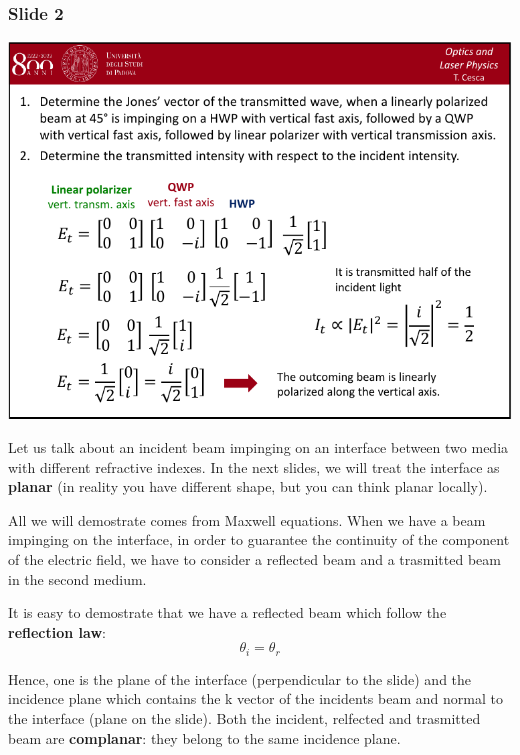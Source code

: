 \documentclass[../main/main.tex]{subfiles}
\begin{document}
\subsubsection*{Slide 2}

\begin{minipage}[]{0.5\linewidth}
\centering
\includegraphics[page=2,width=1\textwidth]{../lessons/pdf_file/04_lecture.pdf}
\end{minipage}
\hspace{0.3cm}\vspace{0.3cm}
\begin{minipage}[c]{0.47\linewidth}

Let us talk about an incident beam impinging on an interface between two media with different refractive indexes. In the next slides, we will treat the interface as \textbf{planar} (in reality you have different shape, but you can think planar locally).

All we will demostrate comes from Maxwell equations. When we have a beam impinging on the interface, in order to guarantee the continuity of the component of the electric field, we have to consider a reflected beam and a trasmitted beam in the second medium.

It is easy to demostrate that we have a reflected beam which follow the \textbf{reflection law}:
\begin{equation*}
  \theta _i = \theta _r
\end{equation*}

\end{minipage}

Hence, one is the plane of the interface (perpendicular to the slide) and the incidence plane which contains the k vector of the incidents beam and normal to the interface (plane on the slide). Both the incident, relfected and trasmitted beam are \textbf{complanar}: they belong to the same incidence plane.
\end{document}
